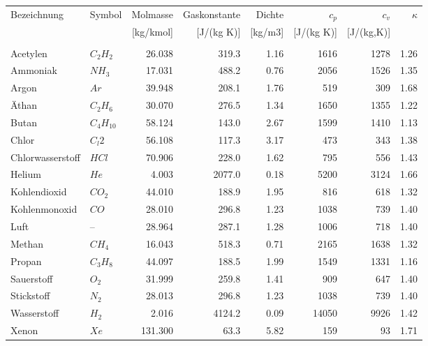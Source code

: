 \documentclass[twocolumn]{article}
\begin{document}
\begin{center}

\begin{tabular}{l|l|r|r|r|r|r|r}
Bezeichnung	&	Symbol	&Molmasse 	&Gaskonstante	&	Dichte	& $c_p$ & $c_v$ &$\kappa$ \\
		&		&[kg/kmol]	&[J/(kg K)]	& 	[kg/m3]	& [J/(kg K)]	& [J/(kg,K)] & \\
	&&&&&&\\
Acetylen	&$	C_2H_2	$&	26.038	&	319.3	&	1.16 	&	1616	&	1278	&	1.26 \\
Ammoniak	&$	NH_3	$&	17.031	&	488.2	&	0.76 	&	2056	&	1526	&	1.35 \\
Argon		&$	Ar	$&	39.948	&	208.1	&	1.76 	&	519	&	309	&	1.68 \\
Äthan		&$	C_2H_6	$&	30.070	&	276.5	&	1.34 	&	1650	&	1355	&	1.22 \\
Butan		&$	C_4H_10	$&	58.124	&	143.0	&	2.67 	&	1599	&	1410	&	1.13 \\
Chlor		&$	C_l2	$&	56.108	&	117.3	&	3.17 	&	473	&	343	&	1.38 \\
Chlorwasserstoff&$	HCl	$&	70.906	&	228.0	&	1.62 	&	795	&	556	&	1.43 \\
Helium		&$	He	$&	4.003	&	2077.0	&	0.18 	&	5200	&	3124	&	1.66 \\
Kohlendioxid	&$	CO_2	$&	44.010	&	188.9	&	1.95 	&	816	&	618	&	1.32 \\
Kohlenmonoxid	&$	CO	$&	28.010	&	296.8	&	1.23 	&	1038	&	739	&	1.40 \\
Luft		&$	–	$&	28.964	&	287.1	&	1.28 	&	1006	&	718	&	1.40 \\
Methan		&$	CH_4	$&	16.043	&	518.3	&	0.71 	&	2165	&	1638	&	1.32 \\
Propan		&$	C_3H_8	$&	44.097	&	188.5	&	1.99 	&	1549	&	1331	&	1.16 \\
Sauerstoff	&$	O_2	$&	31.999	&	259.8	&	1.41 	&	909	&	647	&	1.40 \\
Stickstoff	&$	N_2	$&	28.013	&	296.8	&	1.23 	&	1038	&	739	&	1.40 \\
Wasserstoff	&$	H_2	$&	2.016	&	4124.2	&	0.09 	&	14050	&	9926	&	1.42 \\
Xenon		&$	Xe	$&	131.300	&	63.3	&	5.82 	&	159	&	93	&	1.71 \\
\end{tabular}

\end{center}
%										                                  
%
\end{document}
